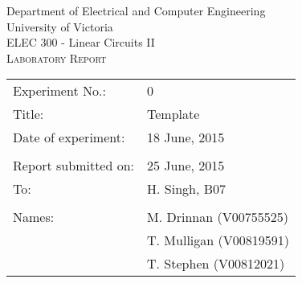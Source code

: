 \begin{center}
	\begin{LARGE}
		Department of Electrical and Computer Engineering \\
		University of Victoria \\
		ELEC 300 - Linear Circuits II \\[1cm]
		\textsc{Laboratory Report}
		\\[1cm]
	\end{LARGE}
\end{center}

\begin{tabular}{ p{} p{} }
	Experiment No.: & 0 \\ 
	Title: & Template \\ 
	Date of experiment:& 18 June, 2015 \\ 
	& \\
	Report submitted on:& 25 June, 2015 \\ 
	To: & H. Singh, B07 \\ 
	& \\
	Names: & M. Drinnan (V00755525)\\
	& T. Mulligan (V00819591) \\
	& T. Stephen (V00812021)  
\end{tabular}

\newpage